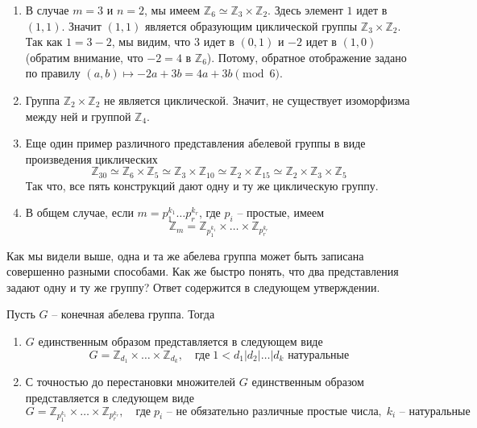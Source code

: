 \begin{examples}
\begin{enumerate}
\item В случае $m = 3$ и $n = 2$, мы имеем $\mathbb Z_6\simeq \mathbb Z_3\times\mathbb Z_2$.
Здесь элемент $1$ идет в $(1, 1)$.
Значит $(1, 1)$ является образующим циклической группы $\mathbb Z_3\times \mathbb Z_2$.
Так как $1 = 3 - 2$, мы видим, что $3$ идет в $(0, 1)$ и $-2$ идет в $(1,0)$  (обратим внимание, что $- 2 = 4$ в $\mathbb Z_6$).
Потому, обратное отображение задано по правилу $(a, b)\mapsto -2a + 3b = 4a + 3b\pmod 6$.

\item Группа $\mathbb Z_2\times \mathbb Z_2$ не является циклической.
Значит, не существует изоморфизма между ней и группой $\mathbb Z_4$.

\item Еще один пример различного представления абелевой группы в виде произведения циклических
\[
\mathbb Z_{30} \simeq \mathbb Z_6 \times \mathbb Z_5 \simeq \mathbb Z_3 \times\mathbb Z_{10}\simeq\mathbb Z_2 \times \mathbb Z_{15} \simeq\mathbb Z_2\times\mathbb Z_3\times \mathbb Z_5
\]
Так что, все пять конструкций дают одну и ту же циклическую группу.

\item В общем случае, если $m = p_1^{k_1}\ldots p_r^{k_r}$, где $p_i$ -- простые, имеем
\[
\mathbb Z_{m} = \mathbb Z_{p_1^{k_1}}\times \ldots \times \mathbb Z_{p_r^{k_r}}
\]
\end{enumerate}
\end{examples}

Как мы видели выше, одна и та же абелева группа может быть записана совершенно разными способами.
Как же быстро понять, что два представления задают одну и ту же группу?
Ответ содержится в следующем утверждении.

\begin{claim}
\label{claim::FAGClass}
Пусть $G$ -- конечная абелева группа.
Тогда
\begin{enumerate}
\item $G$ единственным образом представляется в следующем виде
\[
G = \mathbb Z_{d_1}\times \ldots \times \mathbb Z_{d_k},\quad\text{где}\; 1 < d_1|d_2|\ldots|d_k\text{ натуральные}
\]

\item С точностью до перестановки множителей $G$ единственным образом представляется в следующем виде
\[
G = \mathbb Z_{p_1^{k_1}}\times \ldots \times \mathbb Z_{p_r^{k_r}},\quad \text{где}\; p_i \text{ -- не обязательно различные простые числа},\; k_i\text{ -- натуральные}
\]
\end{enumerate}
\end{claim}

